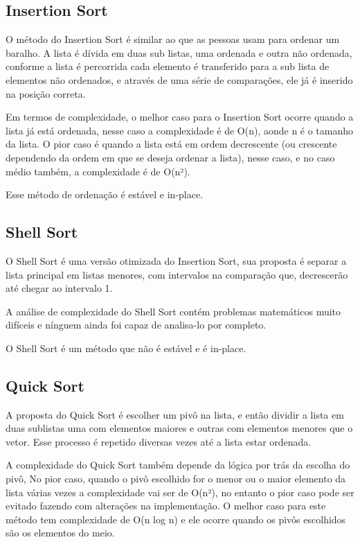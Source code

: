 \documentclass{article}
\begin{document}
	\subsection{Insertion Sort}
	O método do Insertion Sort é similar ao que as pessoas usam para ordenar um baralho. A lista é dívida em duas sub listas, uma ordenada e outra não ordenada, conforme a lista é percorrida cada elemento é transferido para a sub lista de elementos não ordenados, e através de uma série de comparações, ele já é inserido na posição correta.
	
	Em termos de complexidade, o melhor caso para o Insertion Sort ocorre quando a lista já está ordenada, nesse caso a complexidade é de O(n), aonde n é o tamanho da lista. O pior caso é quando a lista está em ordem decrescente (ou crescente dependendo da ordem em que se deseja ordenar a lista), nesse caso, e no caso médio também, a complexidade é de O(n²).
	
	Esse método de ordenação é estável e in-place.\\
	
	\subsection{Shell Sort}
	O Shell Sort é uma versão otimizada do Insertion Sort, sua proposta é separar a lista principal em listas menores, com intervalos na comparação que, decrescerão até chegar ao intervalo 1.
	
	A análise de complexidade do Shell Sort contém problemas matemáticos muito difíceis e nínguem ainda foi capaz de analisa-lo por completo.
	
	O Shell Sort é um método que não é estável e é in-place.\\
	
	\subsection{Quick Sort}
	A proposta do Quick Sort é escolher um pivô na lista, e então dividir a lista em duas sublistas uma com elementos maiores e outras com elementos menores que o vetor. Esse processo é repetido diversas vezes até a lista estar ordenada.
	
	A complexidade do Quick Sort também depende da lógica por trás da escolha do pivô, No pior caso, quando o pivô escolhido for o menor ou o maior elemento da lista várias vezes a complexidade vai ser de O(n²), no entanto o pior caso pode ser evitado fazendo com alterações na implementação. O melhor caso para este método tem complexidade de O(n log n) e ele ocorre quando os pivôs escolhidos são os elementos do meio.
	
\end{document}
